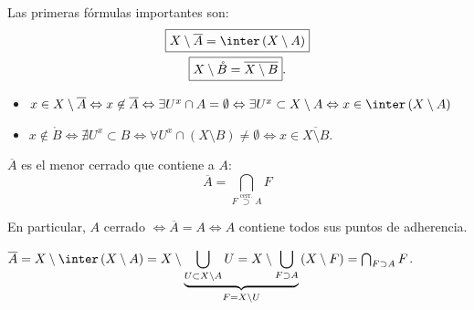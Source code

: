 \begin{obs}
Las primeras fórmulas importantes son:
\begin{gather*}
    \boxed{X \setminus \overline{A} = \inter\left( X \setminus A \right)} \\
    \boxed{X \setminus \mathring{B} = \overline{X \setminus B}} 
.\end{gather*}
\begin{demo}
\begin{itemize}
    \item $x \in X \setminus \overline{A} \Leftrightarrow x \not\in \overline{A} \Leftrightarrow \exists U^x \cap A = \emptyset \Leftrightarrow \exists U^x \subset X \setminus A \Leftrightarrow x \in \inter\left( X \setminus A \right)$
    \item $x \not\in \mathring{B} \Leftrightarrow \nexists U^x \subset B \Leftrightarrow \forall U^x \cap \left( X \setminus B \right) \neq \emptyset \Leftrightarrow x \in \overline{X \setminus B}$.
\end{itemize}
\end{demo}
\end{obs}

\begin{prop}
$\overline{A}$ es el menor cerrado que contiene a $A$: 
\[
    \boxed{\overline{A} = \bigcap_{F \stackrel{\text{cerr.}}{\supset} A} F } 
\]

En particular, $A$ cerrado $\Leftrightarrow \overline{A} = A \Leftrightarrow A$ contiene todos sus puntos de adherencia.
\end{prop}
\begin{demo}
$\overline{A} = X \setminus \inter\left( X \setminus A \right) = X \setminus \underbrace{\bigcup_{U \subset X \setminus A} U = X \setminus \bigcup_{F \supset A}}_{F = X \setminus U} \left( X \setminus F \right) = \bigcap_{F \supset A} F$.
\end{demo}

